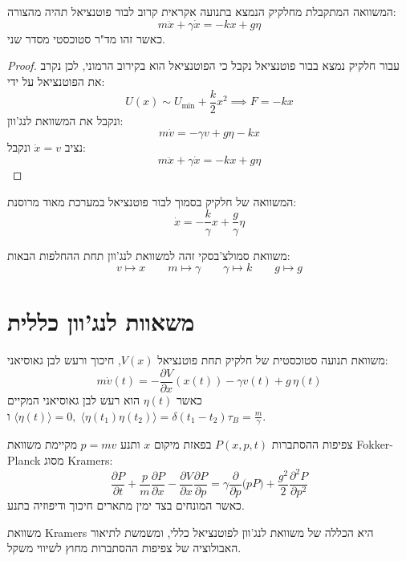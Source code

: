 \documentclass{tstextbook}
\begin{document}
\begin{proposition}
המשוואה המתקבלת מחלקיק הנמצא בתנועה אקראית קרוב לבור פוטנציאל תהיה מהצורה:
$$m{\ddot{x}}+\gamma{\dot{x}}=-k x+g\eta$$
כאשר זהו מד"ר סטוכסטי מסדר שני.

\end{proposition}
\begin{proof}
עבור חלקיק נמצא בבור פוטנציאל נקבל כי הפוטנציאל הוא בקירוב הרמוני, לכן נקרב את הפוטנציאל על ידי:
$$U\left(x\right)\sim U_{\mathrm{min}}+{\frac{k}{2}}x^{2}\implies F=-k x$$
ונקבל את המשוואת לנג'וון:
$$m{\dot{v}}=-\gamma v+g\eta-k x$$
נציב \(\dot{x}=v\) ונקבל:
$$m{\ddot{x}}+\gamma{\dot{x}}=-k x+g\eta$$

\end{proof}
\begin{definition}
המשוואה של חלקיק בסמוך לבור פוטנציאל במערכת מאוד מרוסנת:
$$\dot{x}=-{\frac{k}{\gamma}}x+{\frac{g}{\gamma}}\eta$$

\end{definition}
\begin{remark}
משוואת סמולצ'בסקי זהה למשוואת לנג'וון תחת ההחלפות הבאות:
$$v\mapsto x\qquad m\mapsto \gamma \qquad \gamma \mapsto k\qquad g\mapsto g$$

\end{remark}
\section{משאוות לנג'וון כללית}

\begin{proposition}
משוואת תנועה סטוכסטית של חלקיק תחת פוטנציאל \(V(x)\), חיכוך ורעש לבן גאוסיאני:
$$m\dot v(t) = -\frac{\partial V}{\partial x}(x(t)) - \gamma v(t) + g\,\eta(t)
$$
כאשר \(\eta(t)\) הוא רעש לבן גאוסיאני המקיים \(\langle \eta(t)\rangle=0,\;\langle \eta(t_1)\eta(t_2)\rangle=\delta(t_1-t_2)\) ו\(\tau_B = \tfrac{m}{\gamma}\).

\end{proposition}
\begin{proposition}
צפיפות ההסתברות \(P(x,p,t)\) בפאזת מיקום \(x\) ותנע \(p=m v\) מקיימת משוואת Fokker-Planck מסוג Kramers:
$$\frac{\partial P}{\partial t} + \frac{p}{m}\frac{\partial P}{\partial x} - \frac{\partial V}{\partial x}\frac{\partial P}{\partial p}= \gamma \frac{\partial}{\partial p}\bigl(p P\bigr) + \frac{g^{2}}{2}\frac{\partial^{2}P}{\partial p^{2}}
$$
כאשר המונחים בצד ימין מתארים חיכוך ודיפוזיה בתנע.

\end{proposition}
\begin{remark}
משוואת Kramers היא הכללה של משוואת לנג'וון לפוטנציאל כללי, ומשמשת לתיאור האבולוציה של צפיפות ההסתברות מחוץ לשיווי משקל.

\end{remark}
\end{document}
